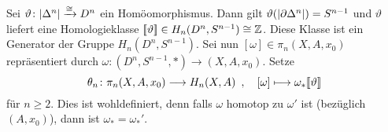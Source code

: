 \begin{definition}[{name={Hurewicz-Abbildung}}]
	Sei $\vartheta \colon \abs*{\Delta^n} \xrightarrow{\cong} D^n$ ein Homöomorphismus. 
	Dann gilt $\vartheta \enbrace*{\abs*{\partial \Delta^n}}= S^{n-1}$ und $\vartheta$ liefert eine Homologieklasse $[\![\vartheta]\!] \in H_n(D^n,S^{n-1}) \cong \mathbb{Z}$. 
	Diese Klasse ist ein Generator der Gruppe $H_n(D^n,S^{n-1})$. 
	Sei nun $[\omega] \in \pi_n(X,A,x_0)$ repräsentiert durch $\omega \colon (D^n,S^{n-1},*) \to (X,A,x_0)$. Setze 
	\[
		\theta_n \colon \pi_n(X,A,x_0) \longrightarrow H_n(X,A) \enspace, \quad [\omega] \longmapsto \omega_*[\![\vartheta]\!] 
	\]
	für $n \ge 2$. Dies ist wohldefiniert, denn falls $\omega$ homotop zu $\omega'$ ist (bezüglich $(A,x_0)$), dann ist $\omega_*=\omega_*'$.
\end{definition}


